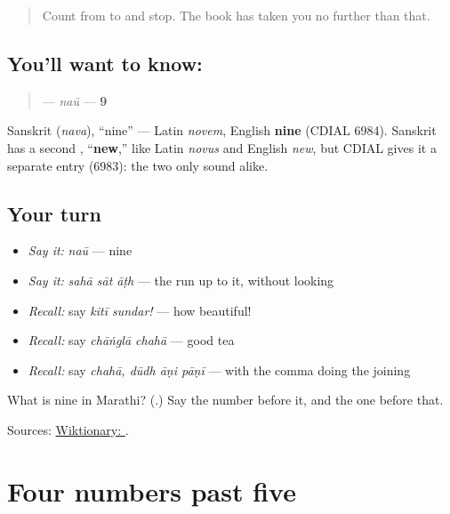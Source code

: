 \label{lesson:MR-C55-nau}



\begin{quote}
Count from \textbf{} to \textbf{} and stop. The book has taken you no further than that.
\end{quote}

\subsection*{You'll want to know: }
\begin{quote}
\textbf{} — \emph{naū} — \textbf{9}
\end{quote}

Sanskrit \textbf{} (\emph{nava}), \textquotedblleft{}nine\textquotedblright{} — Latin \emph{novem}, English \textbf{nine} (CDIAL 6984). Sanskrit has a second \textbf{}, \textquotedblleft{}\textbf{new},\textquotedblright{} like Latin \emph{novus} and English \emph{new}, but CDIAL gives it a separate entry (6983): the two only sound alike.

\subsection*{Your turn}
\begin{itemize}
\raggedright
  \item \emph{Say it:} \emph{naū} — nine
  \item \emph{Say it:} \emph{sahā sāt āṭh} — the run up to it, without looking
  \item \emph{Recall:} say \emph{kitī sundar!} — how beautiful!
  \item \emph{Recall:} say \emph{chāṅglā chahā} — good tea
  \item \emph{Recall:} say \emph{chahā, dūdh āṇi pāṇī} — with the comma doing the joining
\end{itemize}

\begin{tcolorbox}[breakable,colback=teal!4,colframe=teal!35!black,title={Before you move on}]
What is nine in Marathi? (\textbf{}.) Say the number before it, and the one before that.

Sources: \href{https://en.wiktionary.org/wiki/\%E0\%A4\%A8\%E0\%A4\%8A}{Wiktionary: }.
\end{tcolorbox}
\section[\texorpdfstring{\mr{सहा} · \mr{सात} · \mr{आठ} … (sahā · sāt · āṭh …)}{सहा · सात · आठ … (sahā · sāt · āṭh …)}]{Four numbers past five}

